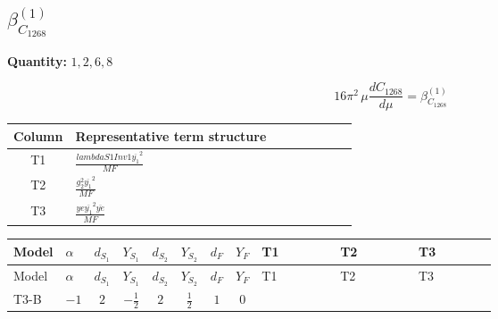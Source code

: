 \documentclass[8pt]{article}
\begin{document}
\begin{landscape}
\section*{$\beta_{C_{1268}}^{(1)}$}
\noindent\textbf{Quantity: }$\mathrm{1,2,6,8}$\par\smallskip
\[16\pi^2\,\mu\frac{d C_{1268}}{d\mu}=\beta_{C_{1268}}^{(1)}\]
\begin{center}
\begin{tabular}{@{}c >{\raggedright\arraybackslash}p{0.82\linewidth}@{}}
\toprule
Column & Representative term structure \\
\midrule
T1 & \(\displaystyle \frac{lambdaS1Inv1 \overline{y_{1}}^{2}}{MF}\) \\
\midrule
T2 & \(\displaystyle \frac{g_{2}^{2} \overline{y_{1}}^{2}}{MF}\) \\
\midrule
T3 & \(\displaystyle \frac{ye \overline{y_{1}}^{2} \overline{ye}}{MF}\) \\
\midrule
\bottomrule
\end{tabular}
\end{center}
\smallskip
\tiny
\begin{longtable}{@{}llcccccc >{\raggedright\arraybackslash}p{0.21\linewidth} >{\raggedright\arraybackslash}p{0.21\linewidth} >{\raggedright\arraybackslash}p{0.21\linewidth}@{}}
\toprule
Model & $\alpha$ & $d_{S_1}$ & $Y_{S_1}$ & $d_{S_2}$ & $Y_{S_2}$ & $d_F$ & $Y_F$ & T1 & T2 & T3 \\
\midrule
\endfirsthead
\toprule
Model & $\alpha$ & $d_{S_1}$ & $Y_{S_1}$ & $d_{S_2}$ & $Y_{S_2}$ & $d_F$ & $Y_F$ & T1 & T2 & T3 \\
\midrule
\endhead
T3-B & $-1$ & $2$ & $-\frac{1}{2}$ & $2$ & $\frac{1}{2}$ & $1$ & $0$ & \scriptsize\adjustbox{max width=\linewidth}{$\begin{gathered} \frac{lambdaS1Inv1 \overline{y_{1}}^{2}}{4 MF}\end{gathered}$} & \scriptsize\adjustbox{max width=\linewidth}{$\begin{gathered} \frac{3 g_{2}^{2} \overline{y_{1}}^{2}}{8 MF}\end{gathered}$} & \scriptsize\adjustbox{max width=\linewidth}{$\begin{gathered} - \frac{ye \overline{y_{1}}^{2} \overline{ye}}{8 MF}\end{gathered}$} \\
\midrule
\bottomrule
\end{longtable}
\clearpage

\end{landscape}
\end{document}
